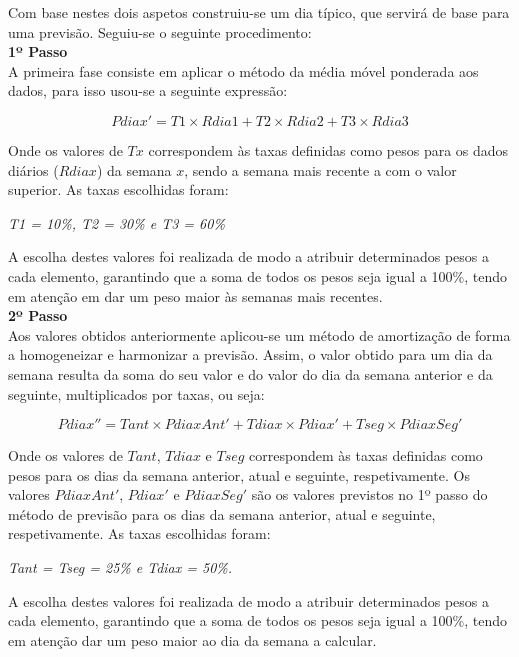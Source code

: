 Com base nestes dois aspetos construiu-se um dia típico, que servirá de base para uma previsão. Seguiu-se o seguinte procedimento:\\

\textbf{1º Passo}\\
A primeira fase consiste em aplicar o método da média móvel ponderada aos dados, para isso usou-se a seguinte expressão:

\begin{equation} 
Pdiax'= T1 \times Rdia1 + T2 \times Rdia2 + T3 \times Rdia3
\end{equation}

Onde os valores de $Tx$ correspondem às taxas definidas como pesos para os dados diários ($Rdiax$) da semana $x$, sendo a semana mais recente a com o valor superior. As taxas escolhidas foram: 
\begin{center}
	\textit{T1 = 10\%, T2 = 30\% e T3 = 60\%}
\end{center}
A escolha destes valores foi realizada de modo a atribuir determinados pesos a cada elemento, garantindo que a soma de todos os pesos seja igual a 100\%, tendo em atenção em dar um peso maior às semanas mais recentes.\\

\textbf{2º Passo}\\
Aos valores obtidos anteriormente aplicou-se um método de amortização de forma a homogeneizar e harmonizar a previsão. Assim, o valor obtido para um dia da semana resulta da soma do seu valor e do valor do dia da semana anterior e da seguinte, multiplicados por taxas, ou seja: 

\begin{equation} 
Pdiax''= Tant \times PdiaxAnt' + Tdiax \times Pdiax' + Tseg \times PdiaxSeg'
\end{equation}

Onde os valores de $Tant$, $Tdiax$ e $Tseg$ correspondem às taxas definidas como pesos para os dias da semana anterior, atual e seguinte, respetivamente. Os valores $PdiaxAnt'$, $Pdiax'$ e $PdiaxSeg'$ são os valores previstos no 1º passo do método de previsão para os dias da semana anterior, atual e seguinte, respetivamente. As taxas escolhidas foram: 

\begin{center}
	\textit{Tant = Tseg = 25\%  e Tdiax = 50\%.}
\end{center}
A escolha destes valores foi realizada de modo a atribuir determinados pesos a cada elemento, garantindo que a soma de todos os pesos seja igual a 100\%, tendo em atenção dar um peso maior ao dia da semana a calcular.

